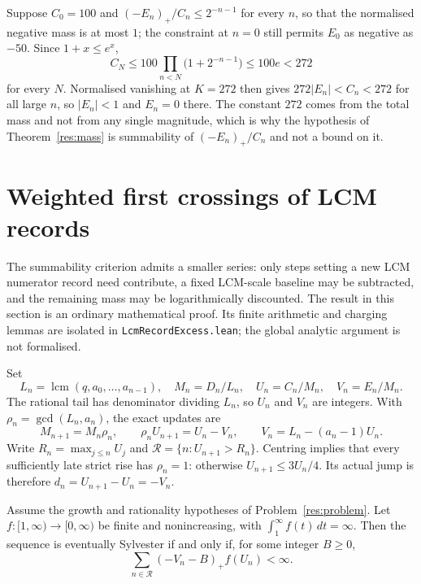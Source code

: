 \documentclass[11pt]{article}
\begin{document}
\begin{example}\label{ex:mass}
Suppose $C_0=100$ and $(-E_n)_+/C_n\le2^{-n-1}$ for every $n$, so that the
normalised negative mass is at most $1$; the constraint at $n=0$ still permits
$E_0$ as negative as $-50$.  Since $1+x\le e^{x}$,
\[
 C_N\le100\prod_{n<N}\bigl(1+2^{-n-1}\bigr)\le100e<272
\]
for every $N$.  Normalised vanishing at $K=272$ then gives
$272|E_n|<C_n<272$ for all large $n$, so $|E_n|<1$ and $E_n=0$ there.  The
constant $272$ comes from the total mass and not from any single magnitude,
which is why the hypothesis of Theorem~\ref{res:mass} is summability of
$(-E_n)_+/C_n$ and not a bound on it.
\end{example}

\section{Weighted first crossings of LCM records}\label{sec:lcmrecords}

The summability criterion admits a smaller series: only steps setting a new
LCM numerator record need contribute, a fixed LCM-scale baseline may be
subtracted, and the remaining mass may be logarithmically discounted.
The result in this section is an ordinary mathematical proof. Its finite
arithmetic and charging lemmas are isolated in
\texttt{LcmRecordExcess.lean}; the global analytic argument is not formalised.

Set
\[
 L_n=\operatorname{lcm}(q,a_0,\ldots,a_{n-1}),\quad
 M_n=D_n/L_n,\quad U_n=C_n/M_n,\quad V_n=E_n/M_n.
\]
The rational tail has denominator dividing $L_n$, so $U_n$ and $V_n$ are
integers. With $\rho_n=\gcd(L_n,a_n)$, the exact updates are
\[
 M_{n+1}=M_n\rho_n,\qquad
 \rho_nU_{n+1}=U_n-V_n,\qquad V_n=L_n-(a_n-1)U_n.
\]
Write $R_n=\max_{j\le n}U_j$ and
$\mathcal R=\{n:U_{n+1}>R_n\}$. Centring implies that every sufficiently
late strict rise has $\rho_n=1$: otherwise $U_{n+1}\le3U_n/4$.
Its actual jump is therefore $d_n=U_{n+1}-U_n=-V_n$.

\begin{theorem}\label{res:weightedrecord}
Assume the growth and rationality hypotheses of Problem~\ref{res:problem}.
Let $f:[1,\infty)\to[0,\infty)$ be finite and nonincreasing, with
$\int_1^\infty f(t)\,dt=\infty$. Then the sequence is eventually Sylvester
if and only if, for some integer $B\ge0$,
\[
 \sum_{n\in\mathcal R}(-V_n-B)_+f(U_n)<\infty.
\]
\end{theorem}
\end{document}
